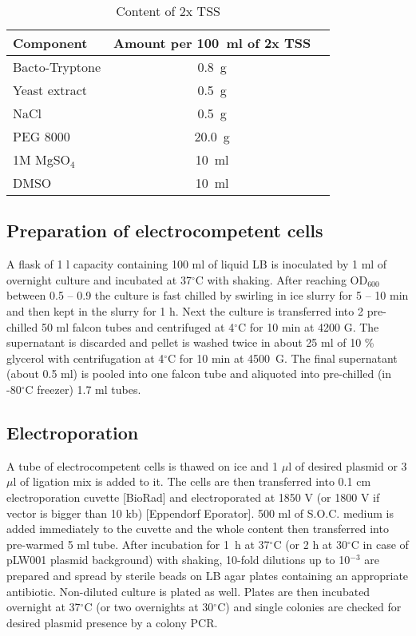 
\begin{center}
	\begin{longtable}[c]{|l|c|c|}
\caption{Content of 2x TSS} \label{tss} \\

\toprule \multicolumn{1}{|l|}{\textbf{Component}} & \multicolumn{1}{c|}{\textbf{Amount per 100~ml of 2x TSS}} \\
\midrule
\endhead

\bottomrule
\endlastfoot

Bacto-Tryptone & 0.8~g \\
\hline
Yeast extract & 0.5~g \\
\hline
NaCl & 0.5~g \\
\hline
PEG 8000 & 20.0~g \\
\hline
1M MgSO$_{4}$ & 10~ml \\
\hline
DMSO & 10~ml \\
	\end{longtable}
\end{center}

\subsection{Preparation of electrocompetent cells}
A flask of 1 l capacity containing 100 ml of liquid LB is inoculated by 1 ml of overnight culture and incubated at 37$^{\circ}$C with shaking.
After reaching OD$_{600}$ between 0.5 -- 0.9 the culture is fast chilled by swirling in ice slurry for 5 -- 10 min and then kept in the slurry for 1 h.
Next the culture is transferred into 2 pre-chilled 50 ml falcon tubes and centrifuged at 4$^{\circ}$C for 10 min at 4200 G.
The supernatant is discarded and pellet is washed twice in about 25 ml of 10 \% glycerol with centrifugation at 4$^{\circ}$C for 10 min at 4500~G.
The final supernatant (about 0.5 ml) is pooled into one falcon tube and aliquoted into pre-chilled (in -80$^{\circ}$C freezer) 1.7 ml tubes.

\subsection{Electroporation}
A tube of electrocompetent cells is thawed on ice and 1 $\mu$l of desired plasmid or 3 $\mu$l of ligation mix is added to it.
The cells are then transferred into 0.1 cm electroporation cuvette [BioRad] and electroporated at 1850 V (or 1800 V if vector is bigger than 10 kb) [Eppendorf Eporator\textsuperscript{\textregistered}].
500 ml of S.O.C. medium is added immediately to the cuvette and the whole content then transferred into pre-warmed 5 ml tube.
After incubation for 1~h at 37$^{\circ}$C (or 2 h at 30$^{\circ}$C in case of pLW001 plasmid background) with shaking, 10-fold dilutions up to 10$^{-3}$ are prepared and spread by sterile beads on LB agar plates containing an appropriate antibiotic.
Non-diluted culture is plated as well.
Plates are then incubated overnight at 37$^{\circ}$C (or two overnights at 30$^{\circ}$C) and single colonies are checked for desired plasmid presence by a colony PCR.


